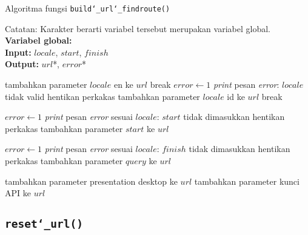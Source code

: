 \begin{algorithm}[h]
	\caption{Algoritma fungsi \texttt{build\char`_url\char`_findroute()}}
	\label{alg:design-buildurl-findroute}
	\vspace{-0.6\baselineskip}
	\begin{flushleft}
		Catatan: Karakter \textquotesingle *\textquotesingle\xspace berarti variabel tersebut merupakan variabel global.\\
		\textbf{Variabel global:}  \\
        \textbf{Input:} $locale$, $start$, $finish$ \\
        \textbf{Output:} $url$*, $error$* \\
	\end{flushleft}
	\vspace{-1.05\baselineskip}
	\begin{algorithmic}
	
			    \State tambahkan parameter $locale$ \textquotesingle\textquotesingle en\textquotesingle\textquotesingle\xspace ke $url$
				\State break
			\EndCase
			    \State $error \gets 1$
				\State \textit{print} pesan \textit{error}: $locale$ tidak valid
				\State hentikan perkakas
			\EndCase
			\Default
				\State tambahkan parameter $locale$ \textquotesingle\textquotesingle id\textquotesingle\textquotesingle\xspace ke $url$
				\State break
			\EndDefault
		\EndSwitch
		
		    \State $error \gets 1$
			\State \textit{print} pesan \textit{error} sesuai $locale$: $start$ tidak dimasukkan
			\State hentikan perkakas
		\Else
			\State tambahkan parameter $start$ ke $url$
		\EndIf
		
		    \State $error \gets 1$
			\State \textit{print} pesan \textit{error} sesuai $locale$: $finish$ tidak dimasukkan
			\State hentikan perkakas
		\Else
			\State tambahkan parameter $query$ ke $url$
		\EndIf
		
		\State tambahkan parameter presentation \textquotesingle\textquotesingle desktop\textquotesingle\textquotesingle\xspace ke $url$
		\State tambahkan parameter kunci API ke $url$
	\end{algorithmic}
\end{algorithm}

\subsection{\texttt{reset\char`_url()}}
\label{sec:design-code-buildurl-reset}

